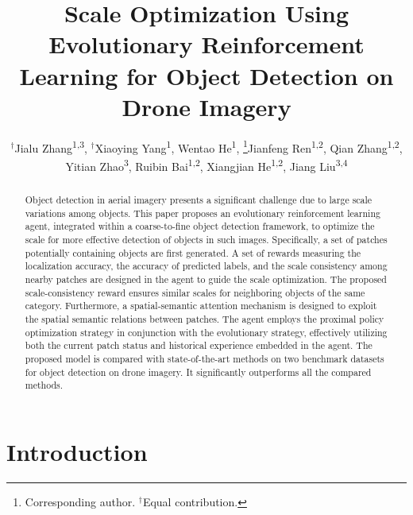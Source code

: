 \documentclass[letterpaper]{article} %
\title{Scale Optimization Using Evolutionary Reinforcement Learning for Object Detection on Drone Imagery}
\author{
  $^\dagger$Jialu Zhang\textsuperscript{\rm 1,3},
  $^\dagger$Xiaoying Yang\textsuperscript{\rm 1},
  Wentao He\textsuperscript{\rm 1},
  \thanks{Corresponding author. $^\dagger$Equal contribution.}Jianfeng Ren\textsuperscript{\rm 1,2},
  Qian Zhang\textsuperscript{\rm 1,2},
  Yitian Zhao\textsuperscript{\rm 3},
  Ruibin Bai\textsuperscript{\rm 1,2},
  Xiangjian He\textsuperscript{\rm 1,2},
  Jiang Liu\textsuperscript{\rm 3,4}
}
\newcommand\blue[1]{\textcolor{blue}{#1}}
\begin{document}
\maketitle

\begin{abstract}
Object detection in aerial imagery presents a significant challenge due to large scale variations among objects. This paper proposes an evolutionary reinforcement learning agent, integrated within a coarse-to-fine object detection framework, to optimize the scale for more effective detection of objects in such images.
Specifically, a set of patches potentially containing objects are first generated.
A set of rewards measuring the localization accuracy, the accuracy of predicted labels, and the scale consistency among nearby patches are designed in the agent to guide the scale optimization. The proposed scale-consistency reward ensures similar scales for neighboring objects of the same category.
Furthermore, a spatial-semantic attention mechanism is designed to exploit the spatial semantic relations between patches.
The agent employs the proximal policy optimization strategy in conjunction with the evolutionary strategy, effectively utilizing both the current patch status and historical experience embedded in the agent.
The proposed model is compared with state-of-the-art methods on two benchmark datasets for object detection on drone imagery. It significantly outperforms all the compared methods. %
\end{abstract}

\section{Introduction}
\label{sec: intro}
\end{document}
